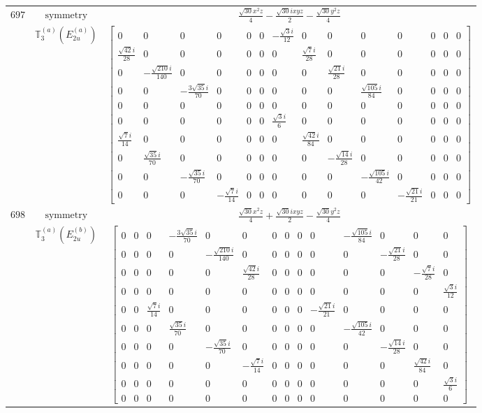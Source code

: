 \documentclass[fleqn,8pt,landscape]{jsarticle}
\begin{document}
\begin{longtable}{ccc}
$ 697 $ & $ \text{symmetry} $ & $ \frac{\sqrt{30} x^{2} z}{4} - \frac{\sqrt{30} i x y z}{2} - \frac{\sqrt{30} y^{2} z}{4} $ \\
$  $ & $ \mathbb{T}_{3}^{(a)}(E_{2u}^{(a)}) $ & $ \begin{bmatrix} 0 & 0 & 0 & 0 & 0 & 0 & - \frac{\sqrt{3} i}{12} & 0 & 0 & 0 & 0 & 0 & 0 & 0 \\ \frac{\sqrt{42} i}{28} & 0 & 0 & 0 & 0 & 0 & 0 & \frac{\sqrt{7} i}{28} & 0 & 0 & 0 & 0 & 0 & 0 \\ 0 & - \frac{\sqrt{210} i}{140} & 0 & 0 & 0 & 0 & 0 & 0 & \frac{\sqrt{21} i}{28} & 0 & 0 & 0 & 0 & 0 \\ 0 & 0 & - \frac{3 \sqrt{35} i}{70} & 0 & 0 & 0 & 0 & 0 & 0 & \frac{\sqrt{105} i}{84} & 0 & 0 & 0 & 0 \\ 0 & 0 & 0 & 0 & 0 & 0 & 0 & 0 & 0 & 0 & 0 & 0 & 0 & 0 \\ 0 & 0 & 0 & 0 & 0 & 0 & \frac{\sqrt{3} i}{6} & 0 & 0 & 0 & 0 & 0 & 0 & 0 \\ \frac{\sqrt{7} i}{14} & 0 & 0 & 0 & 0 & 0 & 0 & \frac{\sqrt{42} i}{84} & 0 & 0 & 0 & 0 & 0 & 0 \\ 0 & \frac{\sqrt{35} i}{70} & 0 & 0 & 0 & 0 & 0 & 0 & - \frac{\sqrt{14} i}{28} & 0 & 0 & 0 & 0 & 0 \\ 0 & 0 & - \frac{\sqrt{35} i}{70} & 0 & 0 & 0 & 0 & 0 & 0 & - \frac{\sqrt{105} i}{42} & 0 & 0 & 0 & 0 \\ 0 & 0 & 0 & - \frac{\sqrt{7} i}{14} & 0 & 0 & 0 & 0 & 0 & 0 & - \frac{\sqrt{21} i}{21} & 0 & 0 & 0 \end{bmatrix} $ \\ \hline
$ 698 $ & $ \text{symmetry} $ & $ \frac{\sqrt{30} x^{2} z}{4} + \frac{\sqrt{30} i x y z}{2} - \frac{\sqrt{30} y^{2} z}{4} $ \\
$  $ & $ \mathbb{T}_{3}^{(a)}(E_{2u}^{(b)}) $ & $ \begin{bmatrix} 0 & 0 & 0 & - \frac{3 \sqrt{35} i}{70} & 0 & 0 & 0 & 0 & 0 & 0 & - \frac{\sqrt{105} i}{84} & 0 & 0 & 0 \\ 0 & 0 & 0 & 0 & - \frac{\sqrt{210} i}{140} & 0 & 0 & 0 & 0 & 0 & 0 & - \frac{\sqrt{21} i}{28} & 0 & 0 \\ 0 & 0 & 0 & 0 & 0 & \frac{\sqrt{42} i}{28} & 0 & 0 & 0 & 0 & 0 & 0 & - \frac{\sqrt{7} i}{28} & 0 \\ 0 & 0 & 0 & 0 & 0 & 0 & 0 & 0 & 0 & 0 & 0 & 0 & 0 & \frac{\sqrt{3} i}{12} \\ 0 & 0 & \frac{\sqrt{7} i}{14} & 0 & 0 & 0 & 0 & 0 & 0 & - \frac{\sqrt{21} i}{21} & 0 & 0 & 0 & 0 \\ 0 & 0 & 0 & \frac{\sqrt{35} i}{70} & 0 & 0 & 0 & 0 & 0 & 0 & - \frac{\sqrt{105} i}{42} & 0 & 0 & 0 \\ 0 & 0 & 0 & 0 & - \frac{\sqrt{35} i}{70} & 0 & 0 & 0 & 0 & 0 & 0 & - \frac{\sqrt{14} i}{28} & 0 & 0 \\ 0 & 0 & 0 & 0 & 0 & - \frac{\sqrt{7} i}{14} & 0 & 0 & 0 & 0 & 0 & 0 & \frac{\sqrt{42} i}{84} & 0 \\ 0 & 0 & 0 & 0 & 0 & 0 & 0 & 0 & 0 & 0 & 0 & 0 & 0 & \frac{\sqrt{3} i}{6} \\ 0 & 0 & 0 & 0 & 0 & 0 & 0 & 0 & 0 & 0 & 0 & 0 & 0 & 0 \end{bmatrix} $ \\ \hline

\end{longtable}
\end{document}
